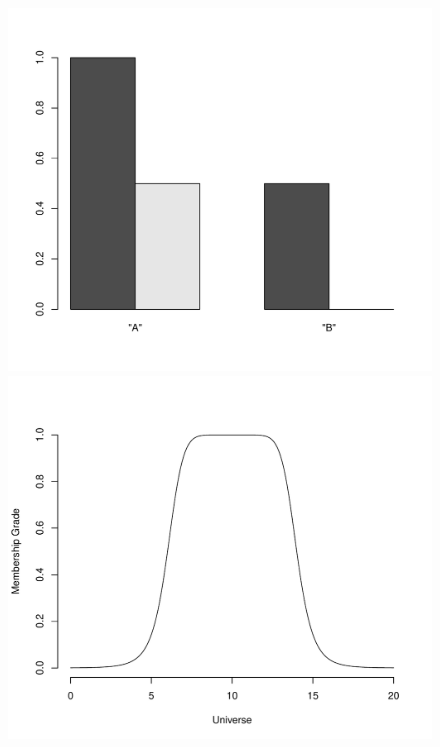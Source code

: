 \documentclass[article]{jss}
\begin{document}
\begin{figure}[h]
\begin{center}
\includegraphics{JSS-plot1fig}
\hfill
\includegraphics{JSS-plot2fig}
\hfill

\end{center}
\end{figure}
\end{document}
